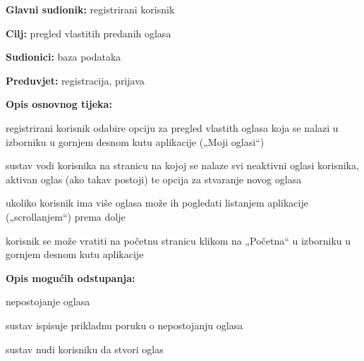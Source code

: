 \noindent {}
\begin{packed_item}
	
	\item \textbf{Glavni sudionik: } registrirani korisnik
	\item  \textbf{Cilj:} pregled vlastitih predanih oglasa
	\item  \textbf{Sudionici:} baza podataka
	\item  \textbf{Preduvjet:} registracija, prijava
	\item  \textbf{Opis osnovnog tijeka:}
	
	\item[] \begin{packed_enum}
		
		\item registrirani korisnik odabire opciju za pregled vlastith oglasa koja se nalazi u izborniku u gornjem desnom kutu aplikacije („Moji oglasi“)
		\item sustav vodi korisnika na stranicu na kojoj se nalaze svi neaktivni oglasi korisnika, aktivan oglas (ako takav postoji) te opcija za stvaranje novog oglasa
		\item ukoliko korisnik ima više oglasa može ih pogledati listanjem aplikacije („scrollanjem“) prema dolje
		\item korisnik se može vratiti na početnu stranicu klikom na „Početna“ u izborniku u gornjem desnom kutu aplikacije
		
		
	\end{packed_enum}
	
	\item  \textbf{Opis mogućih odstupanja:}
	
	\item[] \begin{packed_item}
		
		\item[2.a] nepostojanje oglasa
		\item[] \begin{packed_enum}
			
			\item sustav ispisuje prikladnu poruku o nepostojanju oglasa
			\item sustav nudi korisniku da stvori oglas
			
		\end{packed_enum}
		
	\end{packed_item}
	
\end{packed_item}


